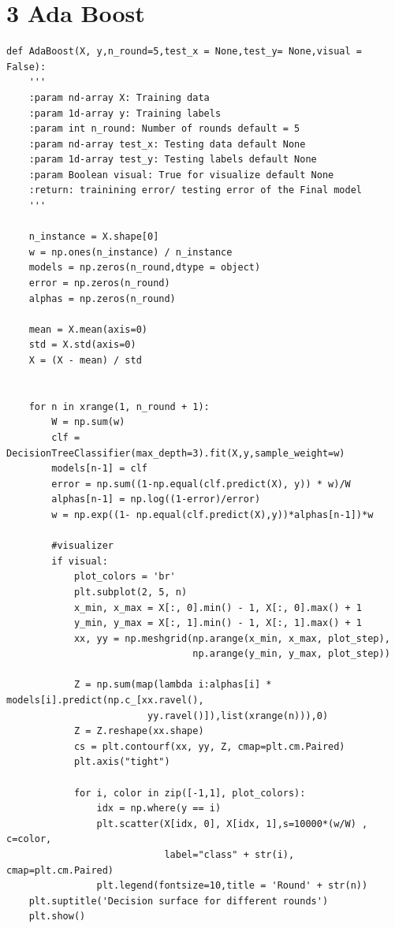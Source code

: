 \documentclass{article}
\newenvironment{problem}[2][$\bullet$]{\begin{trivlist}\large
		\item[\hskip \labelsep {\bfseries #1}\hskip \labelsep {\bfseries #2.}]}  {\end{trivlist}}
\newenvironment{sub}[2][$-$]{\begin{trivlist}
		\item[\hskip \labelsep {\bfseries #1}\hskip \labelsep {\bfseries #2.}]}  {\end{trivlist}}
\begin{document}
\section{3 Ada Boost}
\begin{problem}{3.1 Implementation}
\end{problem}

\begin{sub}{3.1.1}
\end{sub}

\begin{verbatim}
def AdaBoost(X, y,n_round=5,test_x = None,test_y= None,visual = False):
    '''
    :param nd-array X: Training data
    :param 1d-array y: Training labels
    :param int n_round: Number of rounds default = 5
    :param nd-array test_x: Testing data default None
    :param 1d-array test_y: Testing labels default None
    :param Boolean visual: True for visualize default None
    :return: trainining error/ testing error of the Final model  
    '''
    
    n_instance = X.shape[0]
    w = np.ones(n_instance) / n_instance
    models = np.zeros(n_round,dtype = object)
    error = np.zeros(n_round)
    alphas = np.zeros(n_round)

    mean = X.mean(axis=0)
    std = X.std(axis=0)
    X = (X - mean) / std
    

    for n in xrange(1, n_round + 1):
        W = np.sum(w)
        clf = DecisionTreeClassifier(max_depth=3).fit(X,y,sample_weight=w)
        models[n-1] = clf
        error = np.sum((1-np.equal(clf.predict(X), y)) * w)/W
        alphas[n-1] = np.log((1-error)/error)
        w = np.exp((1- np.equal(clf.predict(X),y))*alphas[n-1])*w

        #visualizer
        if visual:
            plot_colors = 'br'
            plt.subplot(2, 5, n)
            x_min, x_max = X[:, 0].min() - 1, X[:, 0].max() + 1
            y_min, y_max = X[:, 1].min() - 1, X[:, 1].max() + 1
            xx, yy = np.meshgrid(np.arange(x_min, x_max, plot_step),
                                 np.arange(y_min, y_max, plot_step))

            Z = np.sum(map(lambda i:alphas[i] * models[i].predict(np.c_[xx.ravel(),
            			 yy.ravel()]),list(xrange(n))),0)
            Z = Z.reshape(xx.shape)
            cs = plt.contourf(xx, yy, Z, cmap=plt.cm.Paired)
            plt.axis("tight")

            for i, color in zip([-1,1], plot_colors):
                idx = np.where(y == i)
                plt.scatter(X[idx, 0], X[idx, 1],s=10000*(w/W) , c=color, 
                			label="class" + str(i), cmap=plt.cm.Paired)
                plt.legend(fontsize=10,title = 'Round' + str(n))
    plt.suptitle('Decision surface for different rounds')
    plt.show()


\end{verbatim}
\end{document}
